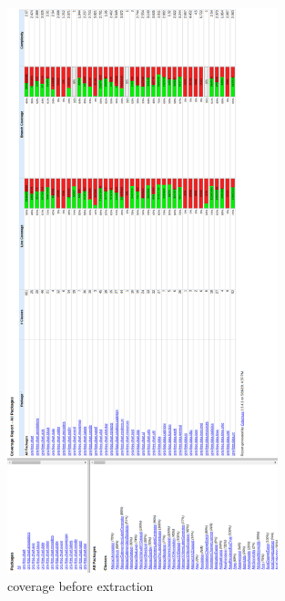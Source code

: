 \documentclass{article}
\begin{document}
\newpage
\begin{figure}[H]
\centering
	\includegraphics[width=0.7\textwidth]{coverage/BEFORE.png}
	\caption{coverage before extraction}
\end{figure}
\end{document}
